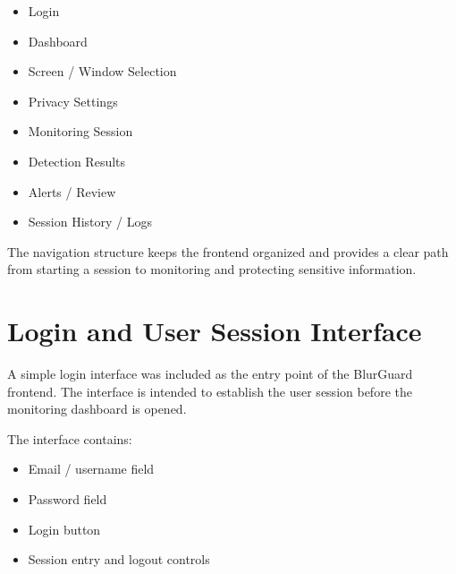 \documentclass[12pt,a4paper]{article}
\begin{document}
\begin{itemize}

    \item Login

    \item Dashboard

    \item Screen / Window Selection

    \item Privacy Settings

    \item Monitoring Session

    \item Detection Results

    \item Alerts / Review

    \item Session History / Logs

\end{itemize}

The navigation structure keeps the frontend organized and provides a clear path from
starting a session to monitoring and protecting sensitive information.


\section{Login and User Session Interface}

A simple login interface was included as the entry point of the BlurGuard frontend.
The interface is intended to establish the user session before the monitoring dashboard
is opened.

The interface contains:

\begin{itemize}

    \item Email / username field

    \item Password field

    \item Login button

    \item Session entry and logout controls

\end{itemize}
\end{document}
